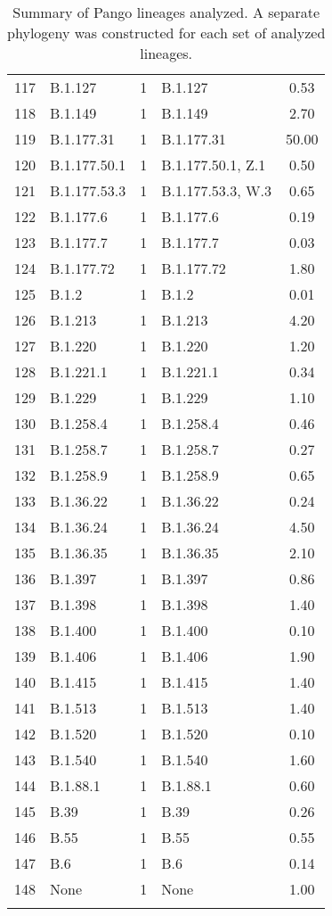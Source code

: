 \begin{longtable}{llcp{4cm}c}
  117 & B.1.127 &   1 & B.1.127 & 0.53 \\ 
  118 & B.1.149 &   1 & B.1.149 & 2.70 \\ 
  119 & B.1.177.31 &   1 & B.1.177.31 & 50.00 \\ 
  120 & B.1.177.50.1 &   1 & B.1.177.50.1, Z.1 & 0.50 \\ 
  121 & B.1.177.53.3 &   1 & B.1.177.53.3, W.3 & 0.65 \\ 
  122 & B.1.177.6 &   1 & B.1.177.6 & 0.19 \\ 
  123 & B.1.177.7 &   1 & B.1.177.7 & 0.03 \\ 
  124 & B.1.177.72 &   1 & B.1.177.72 & 1.80 \\ 
  125 & B.1.2 &   1 & B.1.2 & 0.01 \\ 
  126 & B.1.213 &   1 & B.1.213 & 4.20 \\ 
  127 & B.1.220 &   1 & B.1.220 & 1.20 \\ 
  128 & B.1.221.1 &   1 & B.1.221.1 & 0.34 \\ 
  129 & B.1.229 &   1 & B.1.229 & 1.10 \\ 
  130 & B.1.258.4 &   1 & B.1.258.4 & 0.46 \\ 
  131 & B.1.258.7 &   1 & B.1.258.7 & 0.27 \\ 
  132 & B.1.258.9 &   1 & B.1.258.9 & 0.65 \\ 
  133 & B.1.36.22 &   1 & B.1.36.22 & 0.24 \\ 
  134 & B.1.36.24 &   1 & B.1.36.24 & 4.50 \\ 
  135 & B.1.36.35 &   1 & B.1.36.35 & 2.10 \\ 
  136 & B.1.397 &   1 & B.1.397 & 0.86 \\ 
  137 & B.1.398 &   1 & B.1.398 & 1.40 \\ 
  138 & B.1.400 &   1 & B.1.400 & 0.10 \\ 
  139 & B.1.406 &   1 & B.1.406 & 1.90 \\ 
  140 & B.1.415 &   1 & B.1.415 & 1.40 \\ 
  141 & B.1.513 &   1 & B.1.513 & 1.40 \\ 
  142 & B.1.520 &   1 & B.1.520 & 0.10 \\ 
  143 & B.1.540 &   1 & B.1.540 & 1.60 \\ 
  144 & B.1.88.1 &   1 & B.1.88.1 & 0.60 \\ 
  145 & B.39 &   1 & B.39 & 0.26 \\ 
  146 & B.55 &   1 & B.55 & 0.55 \\ 
  147 & B.6 &   1 & B.6 & 0.14 \\ 
  148 & None &   1 & None & 1.00 \\ 
   \hline
\hline
\caption{Summary of Pango lineages analyzed. A separate phylogeny was constructed for each set of analyzed lineages.} 
\label{tab:lineage-data-summary}
\end{longtable}
